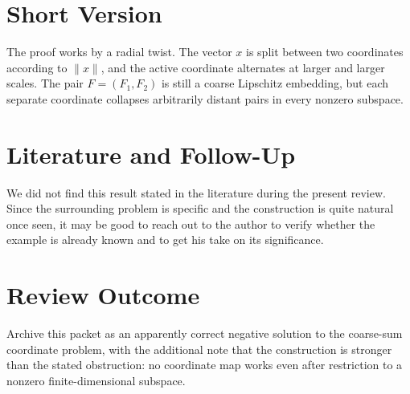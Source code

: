\documentclass[11pt]{article}
\begin{document}
\section*{Short Version}

The proof works by a radial twist. The vector \(x\) is split between two
coordinates according to \(\|x\|\), and the active coordinate alternates at
larger and larger scales. The pair \(F=(F_1,F_2)\) is still a coarse
Lipschitz embedding, but each separate coordinate collapses arbitrarily
distant pairs in every nonzero subspace.

\section*{Literature and Follow-Up}

We did not find this result stated in the literature during the present
review. Since the surrounding problem is specific and the construction is
quite natural once seen, it may be good to reach out to the author to verify
whether the example is already known and to get his take on its significance.

\section*{Review Outcome}

Archive this packet as an apparently correct negative solution to the
coarse-sum coordinate problem, with the additional note that the construction
is stronger than the stated obstruction: no coordinate map works even after
restriction to a nonzero finite-dimensional subspace.
\end{document}
